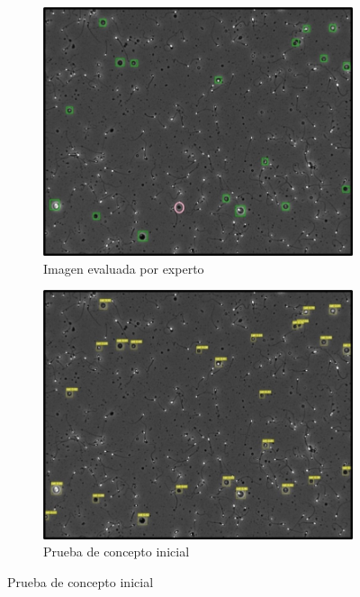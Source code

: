 \documentclass[12pt,a4paper,onecolumn,oneside]{report}
\begin{document}
\begin{figure}[H]
  \centering
  \begin{subfigure}[b]{0.48\textwidth}
    \centering
    \includegraphics[width=\textwidth]{figuras/evaluacion_cualitativa/38/38.jpg}
    \caption{Imagen evaluada por experto}
    \label{fig:exp_image_38}
  \end{subfigure}
  \hfill
  \begin{subfigure}[b]{0.48\textwidth}
    \centering
    \includegraphics[width=\textwidth]{figuras/evaluacion_cualitativa/38/38_v7.jpg}
    \caption{Prueba de concepto inicial}
    \label{fig:poc_image_38}
  \end{subfigure}
  

\end{figure}
\end{document}
